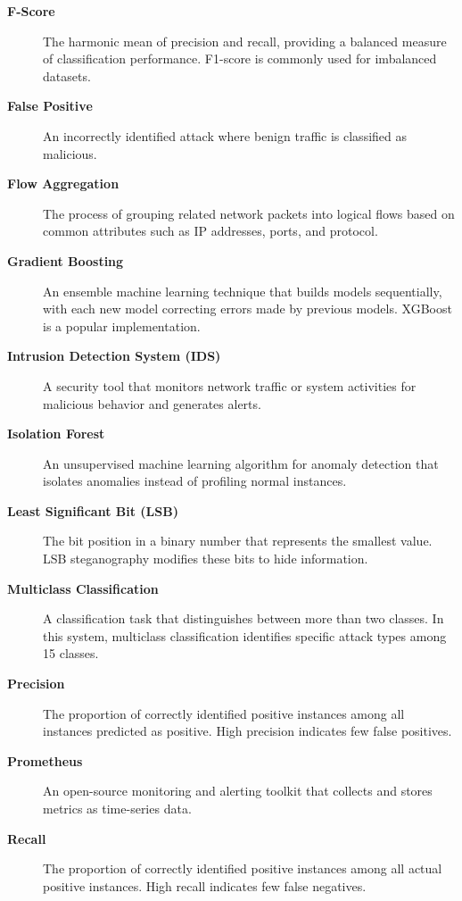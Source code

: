 \documentclass[12pt,a4paper]{report}
\begin{document}
\begin{description}
    \item[\textbf{F-Score}] The harmonic mean of precision and recall, providing a balanced measure of classification performance. F1-score is commonly used for imbalanced datasets.

    \item[\textbf{False Positive}] An incorrectly identified attack where benign traffic is classified as malicious.

    \item[\textbf{Flow Aggregation}] The process of grouping related network packets into logical flows based on common attributes such as IP addresses, ports, and protocol.

    \item[\textbf{Gradient Boosting}] An ensemble machine learning technique that builds models sequentially, with each new model correcting errors made by previous models. XGBoost is a popular implementation.

    \item[\textbf{Intrusion Detection System (IDS)}] A security tool that monitors network traffic or system activities for malicious behavior and generates alerts.

    \item[\textbf{Isolation Forest}] An unsupervised machine learning algorithm for anomaly detection that isolates anomalies instead of profiling normal instances.

    \item[\textbf{Least Significant Bit (LSB)}] The bit position in a binary number that represents the smallest value. LSB steganography modifies these bits to hide information.

    \item[\textbf{Multiclass Classification}] A classification task that distinguishes between more than two classes. In this system, multiclass classification identifies specific attack types among 15 classes.

    \item[\textbf{Precision}] The proportion of correctly identified positive instances among all instances predicted as positive. High precision indicates few false positives.

    \item[\textbf{Prometheus}] An open-source monitoring and alerting toolkit that collects and stores metrics as time-series data.

    \item[\textbf{Recall}] The proportion of correctly identified positive instances among all actual positive instances. High recall indicates few false negatives.


\end{description}
\end{document}
